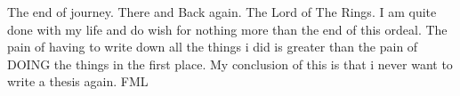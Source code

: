 The end of journey. There and Back again. The Lord of The Rings. 
I am quite done with my life and do wish for nothing more than the end of this ordeal. 
The pain of having to write down all the things i did is greater than the pain of DOING the things in the first place. My conclusion of this is that i never want to write a thesis again. FML 